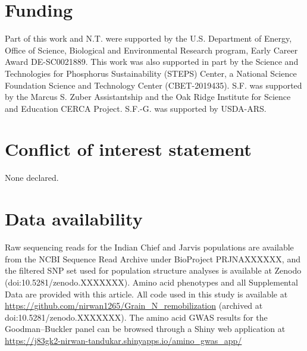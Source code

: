 \documentclass[namedate,unnumsec,webpdf,contemporary,large]{oup-authoring-template}
\begin{document}
\section{Funding}
Part of this work and N.T. were supported by the U.S. Department of Energy, Office of Science, Biological and Environmental Research program, Early Career Award DE-SC0021889. This work was also supported in part by the Science and Technologies for Phosphorus Sustainability (STEPS) Center, a National Science Foundation Science and Technology Center (CBET-2019435). S.F. was supported by the Marcus S. Zuber Assistantship and the Oak Ridge Institute for Science and Education CERCA Project. S.F.-G. was supported by USDA-ARS.

\section{Conflict of interest statement}
None declared.

\section{Data availability}
Raw sequencing reads for the Indian Chief and Jarvis populations are available from the NCBI Sequence Read Archive under BioProject PRJNAXXXXXX, and the filtered SNP set used for population structure analyses is available at Zenodo (doi:10.5281/zenodo.XXXXXXX). Amino acid phenotypes and all Supplemental Data are provided with this article. All code used in this study is available at \url{https://github.com/nirwan1265/Grain_N_remobilization} (archived at doi:10.5281/zenodo.XXXXXXX). The amino acid GWAS results for the Goodman--Buckler panel can be browsed through a Shiny web application at \url{https://j83gk2-nirwan-tandukar.shinyapps.io/amino_gwas_app/}




\end{document}
